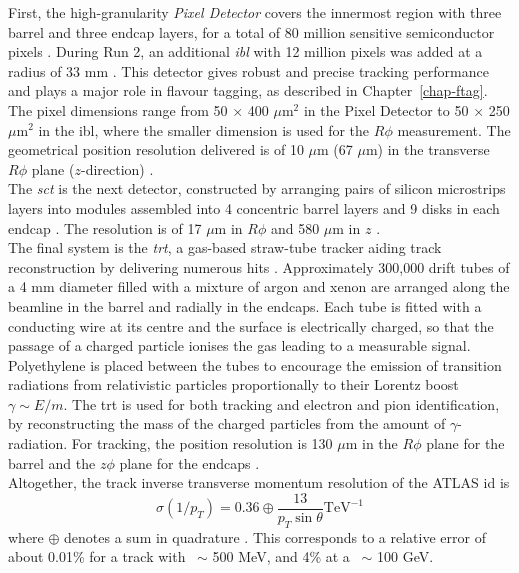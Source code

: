 First, the high-granularity \textit{Pixel Detector} covers the innermost region with three barrel and three endcap layers, for a total of 80 million sensitive semiconductor pixels \cite{CERN-LHCC-97-016, Potamianos:2015lar}. During Run 2, an additional \textit{\gls{ibl}} with 12 million pixels was added at a radius of 33 mm \cite{Capeans:1291633}. This detector gives robust and precise tracking performance and plays a major role in flavour tagging, as described in Chapter~\ref{chap-ftag}. The pixel dimensions range from 50 $\times$ 400 $\mu$m$^2$ in the Pixel Detector to 50 $\times$ 250 $\mu$m$^2$ in the \gls{ibl}, where the smaller dimension is used for the $R\phi$ measurement. The geometrical position resolution delivered is of 10 $\mu$m (67 $\mu$m) in the transverse $R\phi$ plane ($z$-direction) \cite{Pernegger_2015, ATL-INDET-PUB-2016-001}. \\

The \textit{\gls{sct}} is the next detector, constructed by arranging pairs of silicon microstrips layers into modules assembled into 4 concentric barrel layers and 9 disks in each endcap \cite{AHMAD200798, CERN-LHCC-2017-005}. The resolution is of 17 $\mu$m in $R\phi$ and 580 $\mu$m in $z$ \cite{ATLASSCT}. \\

The final system is the \textit{\gls{trt}}, a gas-based straw-tube tracker aiding track reconstruction by delivering numerous hits \cite{TheATLASTRTcollaboration_2008}. Approximately 300,000 drift tubes of a 4 mm diameter filled with a mixture of argon and xenon are arranged along the beamline in the barrel and radially in the endcaps. Each tube is fitted with a conducting wire at its centre and the surface is electrically charged, so that the passage of a charged particle ionises the gas leading to a measurable signal. Polyethylene is placed between the tubes to encourage the emission of transition radiations from relativistic particles proportionally to their Lorentz boost $\gamma \sim E / m$. The \gls{trt} is used for both tracking and electron and pion identification, by reconstructing the mass of the charged particles from the amount of $\gamma$-radiation. For tracking, the position resolution is 130 $\mu$m in the $R\phi$ plane for the barrel and the $z\phi$ plane for the endcaps \cite{Vogel:1537991}. \\

Altogether, the track inverse transverse momentum resolution of the ATLAS \gls{id} is
\begin{equation}
  \sigma(1 / p_T) = 0.36 \oplus \frac{13}{p_T \sin\theta} \text{TeV}^{-1}
\end{equation}
where $\oplus$ denotes a sum in quadrature \cite{TheATLASCollaboration_2008}. This corresponds to a relative error of about 0.01\% for a track with \pt\ $\sim$ 500 MeV, and 4\% at a \pt\ $\sim$ 100 GeV.


